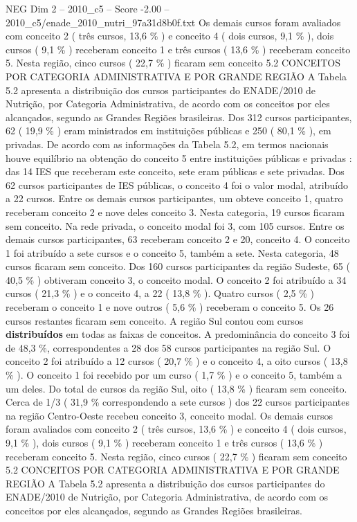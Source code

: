 \begin{textsample}{NEG Dim 2 – 2010\_c5 – Score -2.00 – 2010\_c5/enade\_2010\_nutri\_97a31d8b0f.txt}
Os demais cursos foram avaliados com conceito 2 ( três cursos, 13,6 \% ) e conceito 4 ( dois cursos, 9,1 \% ), dois cursos ( 9,1 \% ) receberam conceito 1 e três cursos ( 13,6 \% ) receberam conceito 5.
Nesta região, cinco cursos ( 22,7 \% ) ficaram sem conceito 5.2 CONCEITOS POR CATEGORIA ADMINISTRATIVA E POR GRANDE REGIÃO A Tabela 5.2 apresenta a distribuição dos cursos participantes do ENADE/2010 de Nutrição, por Categoria Administrativa, de acordo com os conceitos por eles alcançados, segundo as Grandes Regiões brasileiras.
Dos 312 cursos participantes, 62 ( 19,9 \% ) eram ministrados em instituições públicas e 250 ( 80,1 \% ), em privadas.
De acordo com as informações da Tabela 5.2, em termos nacionais houve equilíbrio na obtenção do conceito 5 entre instituições públicas e privadas : das 14 IES que receberam este conceito, sete eram públicas e sete privadas.
Dos 62 cursos participantes de IES públicas, o conceito 4 foi o valor modal, atribuído a 22 cursos.
Entre os demais cursos participantes, um obteve conceito 1, quatro receberam conceito 2 e nove deles conceito 3.
Nesta categoria, 19 cursos ficaram sem conceito.
Na rede privada, o conceito modal foi 3, com 105 cursos.
Entre os demais cursos participantes, 63 receberam conceito 2 e 20, conceito 4.
O conceito 1 foi atribuído a sete cursos e o conceito 5, também a sete.
Nesta categoria, 48 cursos ficaram sem conceito.
Dos 160 cursos participantes da região Sudeste, 65 ( 40,5 \% ) obtiveram conceito 3, o conceito modal.
O conceito 2 foi atribuído a 34 cursos ( 21,3 \% ) e o conceito 4, a 22 ( 13,8 \% ).
Quatro cursos ( 2,5 \% ) receberam o conceito 1 e nove outros ( 5,6 \% ) receberam o conceito 5.
Os 26 cursos restantes ficaram sem conceito.
A região Sul contou com cursos \textbf{distribuídos} em todas as faixas de conceitos.
A predominância do conceito 3 foi de 48,3 \%, correspondentes a 28 dos 58 cursos participantes na região Sul.
O conceito 2 foi atribuído a 12 cursos ( 20,7 \% ) e o conceito 4, a oito cursos ( 13,8 \% ).
O conceito 1 foi recebido por um curso ( 1,7 \% ) e o conceito 5, também a um deles.
Do total de cursos da região Sul, oito ( 13,8 \% ) ficaram sem conceito.
Cerca de 1/3 ( 31,9 \% correspondendo a sete cursos ) dos 22 cursos participantes na região Centro-Oeste recebeu conceito 3, conceito modal.
Os demais cursos foram avaliados com conceito 2 ( três cursos, 13,6 \% ) e conceito 4 ( dois cursos, 9,1 \% ), dois cursos ( 9,1 \% ) receberam conceito 1 e três cursos ( 13,6 \% ) receberam conceito 5.
Nesta região, cinco cursos ( 22,7 \% ) ficaram sem conceito 5.2 CONCEITOS POR CATEGORIA ADMINISTRATIVA E POR GRANDE REGIÃO A Tabela 5.2 apresenta a distribuição dos cursos participantes do ENADE/2010 de Nutrição, por Categoria Administrativa, de acordo com os conceitos por eles alcançados, segundo as Grandes Regiões brasileiras.

\end{textsample}
